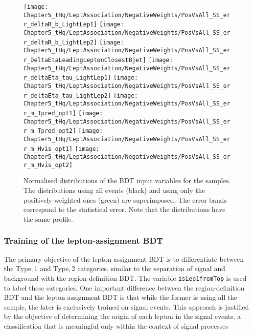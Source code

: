 \begin{figure}[htbp!]
\centering
\texttt{[image: Chapter5\_tHq/LeptAssociation/NegativeWeights/PosVsAll\_SS\_err\_deltaR\_b\_LightLep1]}\quad
\texttt{[image: Chapter5\_tHq/LeptAssociation/NegativeWeights/PosVsAll\_SS\_err\_deltaR\_b\_LightLep2]}\quad
\texttt{[image: Chapter5\_tHq/LeptAssociation/NegativeWeights/PosVsAll\_SS\_err\_DeltaEtaLeadingLeptonClosestBjet]}
\medskip
\texttt{[image: Chapter5\_tHq/LeptAssociation/NegativeWeights/PosVsAll\_SS\_err\_deltaEta\_tau\_LightLep1]}\quad
\texttt{[image: Chapter5\_tHq/LeptAssociation/NegativeWeights/PosVsAll\_SS\_err\_deltaEta\_tau\_LightLep2]}\quad
\texttt{[image: Chapter5\_tHq/LeptAssociation/NegativeWeights/PosVsAll\_SS\_err\_m\_Tpred\_opt1]}
\medskip
\texttt{[image: Chapter5\_tHq/LeptAssociation/NegativeWeights/PosVsAll\_SS\_err\_m\_Tpred\_opt2]}\quad
\texttt{[image: Chapter5\_tHq/LeptAssociation/NegativeWeights/PosVsAll\_SS\_err\_m\_Hvis\_opt1]}\quad
\texttt{[image: Chapter5\_tHq/LeptAssociation/NegativeWeights/PosVsAll\_SS\_err\_m\_Hvis\_opt2]}
\caption{Normalised distributions of the BDT input variables for the \dilepSStau samples. 
The distributions using all events (black) and using only the positively-weighted ones (green)
are superimposed. The error bands correspond to the statistical error. 
Note that the distributions have the same profile.}
\label{fig:dileptau:Assignment_appendix:NegativeWeights}
\end{figure}



\subsubsection{Training of the lepton-assignment BDT}
\label{sec:ChaptH:Sig:LepAsign:SS:BDT:Training}
The primary objective of the lepton-assignment BDT is to differentiate 
between the Type$,$1 and Type$,$2 categories, similar to the separation 
of signal and background with the region-definition BDT. The variable 
\texttt{isLep1fromTop} is used to label these categories. One important
difference between the region-definition BDT and the lepton-assignment BDT
is that while the former is using all the sample, the later is exclusively trained 
on \dilepSStau signal events. This approach is justified by the objective of 
determining the origin of each lepton in the signal events, a classification 
that is meaningful only within the context of signal processes

